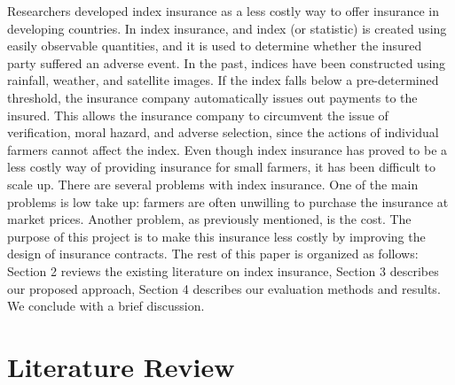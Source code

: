 \documentclass[11pt]{article}
\begin{document}
Researchers developed index insurance as a less costly way to offer insurance in developing countries. In index insurance, and index (or statistic) is created using easily observable quantities, and it is used to determine whether the insured party suffered an adverse event. In the past, indices have been constructed using rainfall, weather, and satellite images. If the index falls below a pre-determined threshold, the insurance company automatically issues out payments to the insured. This allows the insurance company to circumvent the issue of verification, moral hazard, and adverse selection, since the actions of individual farmers cannot affect the index. Even though index insurance has proved to be a less costly way of providing insurance for small farmers, it has been difficult to scale up. There are several problems with index insurance. One of the main problems is low take up: farmers are often unwilling to purchase the insurance at market prices. Another problem, as previously mentioned, is the cost. The purpose of this project is to make this insurance less costly by improving the design of insurance contracts. The rest of this paper is organized as follows: Section 2 reviews the existing literature on index insurance, Section 3 describes our proposed approach, Section 4 describes our evaluation methods and results. We conclude with a brief discussion. 

\section{Literature Review}
\end{document}
